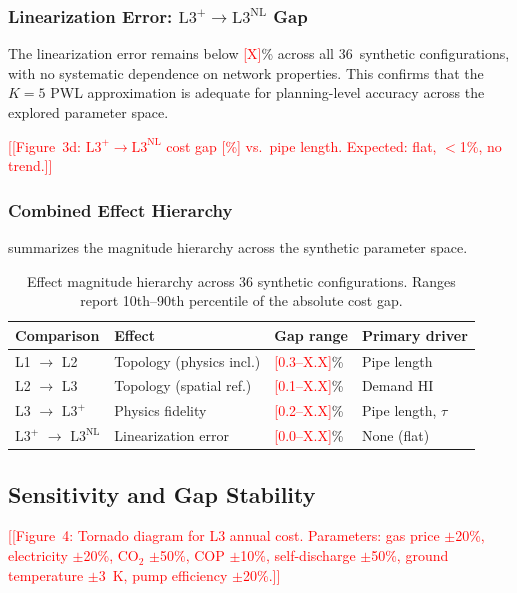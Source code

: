 \documentclass[review,3p]{elsarticle}
\newcommand{\placeholder}[1]{\textcolor{red}{[#1]}}
\newcommand{\Lplus}{\mathrm{L3}^{+}}
\newcommand{\Lnl}{\mathrm{L3}^{\mathrm{NL}}}
\begin{document}
\subsubsection{Linearization Error: $\Lplus\to\Lnl$ Gap}

The linearization error remains below \placeholder{X}\% across all
36~synthetic configurations, with no systematic dependence on
network properties. This confirms that the $K=5$ PWL approximation
is adequate for planning-level accuracy across the explored
parameter space.

\placeholder{[Figure~3d: $\Lplus\to\Lnl$ cost gap [\%] vs.\ pipe
length. Expected: flat, $<$1\%, no trend.]}

\subsubsection{Combined Effect Hierarchy}

 summarizes the magnitude hierarchy
across the synthetic parameter space.

\begin{table}[htbp]
\centering
\caption{Effect magnitude hierarchy across 36 synthetic
configurations. Ranges report 10th--90th percentile of the
absolute cost gap.}
\label{tab:effect_hierarchy}
\begin{tabular}{@{}llll@{}}
\toprule
Comparison & Effect & Gap range & Primary driver \\
\midrule
L1 $\to$ L2 & Topology (physics incl.)
  & \placeholder{0.3--X.X}\% & Pipe length \\
L2 $\to$ L3 & Topology (spatial ref.)
  & \placeholder{0.1--X.X}\% & Demand HI \\
L3 $\to$ $\Lplus$ & Physics fidelity
  & \placeholder{0.2--X.X}\% & Pipe length, $\tau$ \\
$\Lplus$ $\to$ $\Lnl$ & Linearization error
  & \placeholder{0.0--X.X}\% & None (flat) \\
\bottomrule
\end{tabular}
\end{table}

\subsection{Sensitivity and Gap Stability}
\label{sec:results_sensitivity}

\placeholder{[Figure~4: Tornado diagram for L3 annual cost.
Parameters: gas price $\pm$20\%, electricity $\pm$20\%,
CO$_2$ $\pm$50\%, COP $\pm$10\%, self-discharge $\pm$50\%,
ground temperature $\pm$3~K, pump efficiency $\pm$20\%.]}
\end{document}
